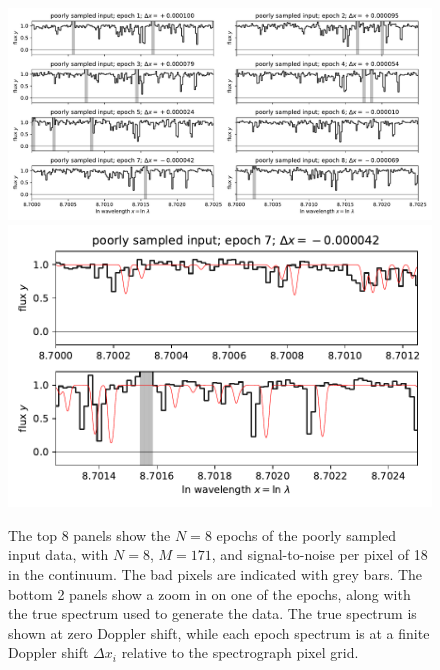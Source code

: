 \documentclass[modern]{aastex631}
\newlength{\figurewidth}
\begin{document}
\begin{figure}[t!]
    \begin{mdframed}\begin{center}
    \includegraphics[width=1.3\figurewidth]{notebooks/data1.pdf}\\
    \includegraphics[width=\figurewidth]{notebooks/datazoom.pdf}
    \end{center}
    \caption{The top 8 panels show the $N=8$ epochs of the poorly sampled input data, with $N=8$, $M=171$, and signal-to-noise per pixel of 18 in the continuum. The bad pixels are indicated with grey bars. The bottom 2 panels show a zoom in on one of the epochs, along with the true spectrum used to generate the data. The true spectrum is shown at zero Doppler shift, while each epoch spectrum is at a finite Doppler shift $\Delta x_i$ relative to the spectrograph pixel grid.\label{fig:data1}}
    \end{mdframed}
\end{figure}
\end{document}
